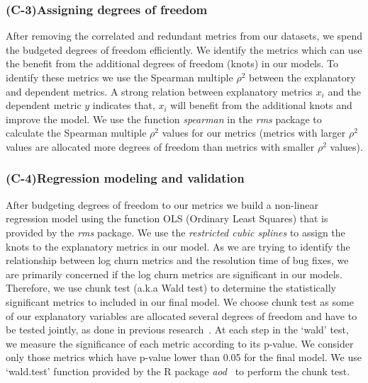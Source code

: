\subsubsection*{(C-3)Assigning degrees of freedom}


After removing the correlated and redundant metrics from our datasets, we spend the budgeted degrees of freedom efficiently. We identify the metrics which can use the benefit from the additional degrees of freedom (knots) in our models. To identify these metrics we use the Spearman multiple $\rho^{2}$ between the explanatory and dependent metrics. A strong relation between explanatory metrics $x_{i}$ and the dependent metric $y$ indicates that, $x_{i}$ will benefit from the additional knots and improve the model. We use the function \textsl{spearman} in the \textsl{rms} package to calculate the Spearman multiple $\rho^{2}$ values for our metrics (metrics with larger $\rho^{2}$  values are allocated more degrees of freedom than metrics with smaller $\rho^{2}$ values).

\subsubsection*{(C-4)Regression modeling and validation}

After budgeting degrees of freedom to our metrics we build a non-linear regression model using the function OLS (Ordinary Least Squares) that is provided by the \textsl{rms} package. We use the \textsl{restricted cubic splines} to assign the knots to the explanatory metrics in our model. 
As we are trying to identify the relationship between log churn metrics and the resolution time of bug fixes, we are primarily concerned if the log churn metrics are significant in our models. Therefore, we use chunk test (a.k.a Wald test) to determine the statistically significant metrics to included in our final model. We choose chunk test as some of our explanatory variables are allocated several degrees of freedom and have to be tested jointly, as done in previous research~\cite{ShaneOLS}. At each step in the `wald' test, we measure the significance of each metric according to its p-value. We consider only those metrics which have p-value lower than 0.05 for the final model. We use `wald.test' function provided by the R package \emph{aod}~\cite{waldtest} to perform the chunk test.  
%




